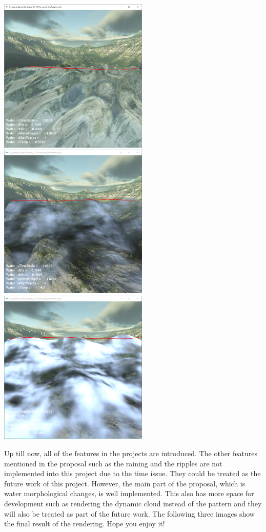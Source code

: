 \documentclass[letterpaper,14pt,titlepage,fleqn]{article}
\begin{document}
\begin{center}
	\includegraphics[width=2.8in]{heightwater.jpg}
	\includegraphics[width=2.8in]{heightcloud1.jpg}
	\includegraphics[width=2.8in]{heightcloud2.jpg}
\end{center}
Up till now, all of the features in the projects are introduced. The other features mentioned in the proposal such as the raining and the ripples are not implemented into this project due to the time issue. They could be treated as the future work of this project. However, the main part of the proposal, which is water morphological changes, is well implemented. This also has more space for development such as rendering the dynamic cloud instead of the pattern and they will also be treated as part of the future work. The following three images show the final result of the rendering. Hope you enjoy it!
\end{document}
